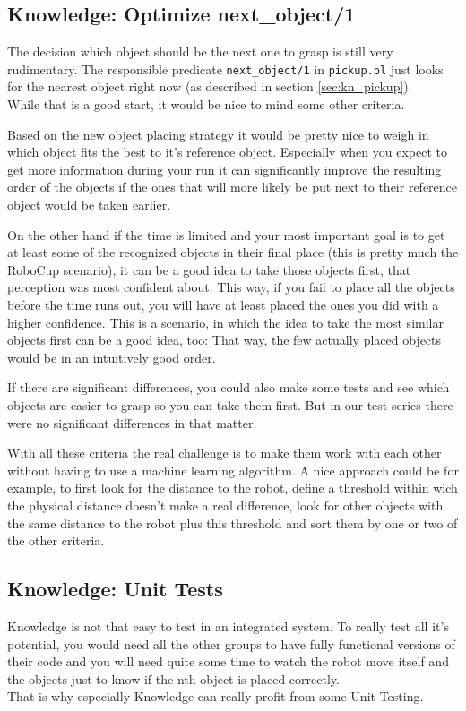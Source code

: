\documentclass[main.tex]{subfiles}
\begin{document}
	  	\subsection{Knowledge: Optimize next\_object/1}
	  	The decision which object should be the next one to grasp is still very rudimentary. The responsible predicate \texttt{next\_object/1} in \texttt{pickup.pl} just looks for the nearest object right now (as described in section \ref{sec:kn_pickup}).\\
	  	While that is a good start, it would be nice to mind some other criteria.
	  	
	  	Based on the new object placing strategy it would be pretty nice to weigh in which object fits the best to it's reference object. Especially when you expect to get more information during your run it can significantly improve the resulting order of the objects if the ones that will more likely be put next to their reference object would be taken earlier.
	  	
		On the other hand if the time is limited and your most important goal is to get at least some of the recognized objects in their final place (this is pretty much the RoboCup scenario), it can be a good idea to take those objects first, that perception was most confident about. This way, if you fail to place all the objects before the time runs out, you will have at least placed the ones you did with a higher confidence. This is a scenario, in which the idea to take the most similar objects first can be a good idea, too: That way, the few actually placed objects would be in an intuitively good order.
		
		If there are significant differences, you could also make some tests and see which objects are easier to grasp so you can take them first. But in our test series there were no significant differences in that matter. 
		
		With all these criteria the real challenge is to make them work with each other without having to use a machine learning algorithm. A nice approach could be for example, to first look for the distance to the robot, define a threshold within wich the physical distance doesn't make a real difference, look for other objects with the same distance to the robot plus this threshold and sort them by one or two of the other criteria. 
		
		\subsection{Knowledge: Unit Tests}
		Knowledge is not that easy to test in an integrated system. To really test all it's potential, you would need all the other groups to have fully functional versions of their code and you will need quite some time to watch the robot move itself and the objects just to know if the nth object is placed correctly.\\
		That is why especially Knowledge can really profit from some Unit Testing.
		
\end{document}
